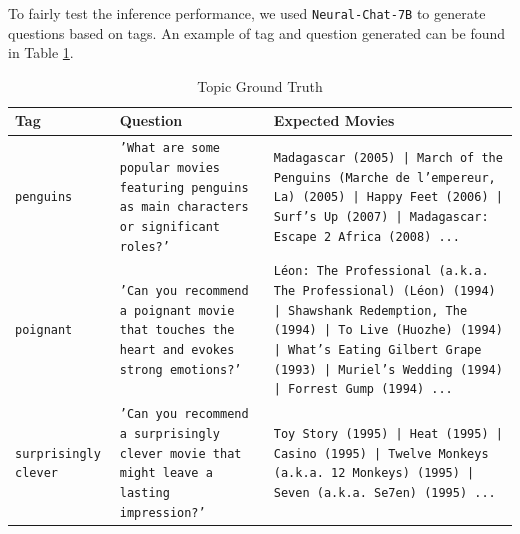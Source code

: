 \documentclass[journal]{IEEEtran}
\theoremstyle{mydefstyle}
\begin{document}
To fairly test the inference performance, we used \texttt{Neural-Chat-7B} to generate questions based on tags. An example of tag and question generated can be found in Table \ref{tab:ground_truth_topic}.

\begin{table}[ht]
\centering
\scriptsize
\caption{Topic Ground Truth}
\label{tab:ground_truth_topic}
\begin{tabular}{|>{\centering\arraybackslash}m{1.5cm}|>{\centering\arraybackslash}m{2.1cm}|>{\centering\arraybackslash}m{3.4cm}|}
\hline
\textbf{Tag} & \textbf{Question} & \textbf{Expected Movies} \\
\hline
\texttt{penguins} & \texttt{'What are some popular movies featuring penguins as main characters or significant roles?'} & \texttt{Madagascar (2005) | March of the Penguins (Marche de l'empereur, La) (2005) | Happy Feet (2006) | Surf's Up (2007) | Madagascar: Escape 2 Africa (2008) ...} \\
\hline
\texttt{poignant} & \texttt{'Can you recommend a poignant movie that touches the heart and evokes strong emotions?'} & \texttt{Léon: The Professional (a.k.a. The Professional) (Léon) (1994) | Shawshank Redemption, The (1994) | To Live (Huozhe) (1994) | What's Eating Gilbert Grape (1993) | Muriel's Wedding (1994) | Forrest Gump (1994) ...} \\
\hline
\texttt{surprisingly clever} & \texttt{'Can you recommend a surprisingly clever movie that might leave a lasting impression?'} & \texttt{Toy Story (1995) | Heat (1995) | Casino (1995) | Twelve Monkeys (a.k.a. 12 Monkeys) (1995) | Seven (a.k.a. Se7en) (1995) ...} \\
\hline
\end{tabular}
\end{table}
\end{document}
